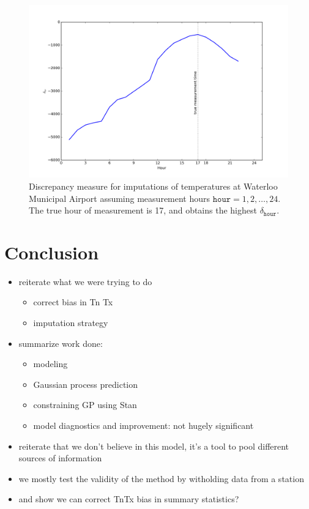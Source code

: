 \documentclass[letter]{article}
\makeatletter
\def\maxwidth{\ifdim\Gin@nat@width>\linewidth\linewidth
\else\Gin@nat@width\fi}
\let\Oldincludegraphics\includegraphics
\renewcommand{\includegraphics}[1]{\Oldincludegraphics[width=.8\maxwidth]{#1}}
\providecommand{\tightlist}{%
      \setlength{\itemsep}{0pt}\setlength{\parskip}{0pt}}
\newcommand{\hour}{\mathtt{hour}}
\providecommand{\tightlist}{%
  	  \setlength{\itemsep}{0pt}\setlength{\parskip}{0pt}}
\makeatother
\begin{document}
        \begin{figure}
\centering
\includegraphics{../figures/hr_inference.png}
\caption{\label{fig:hr_inference} Discrepancy measure for imputations of temperatures at Waterloo Municipal Airport assuming measurement hours \(\hour=1,2,\ldots,24\). The true hour of measurement is 17, and obtains the highest \(\delta_\hour\).}
\end{figure}
    


        \section{Conclusion}\label{conclusion}

\begin{itemize}
\tightlist
\item
  reiterate what we were trying to do

  \begin{itemize}
  \tightlist
  \item
    correct bias in Tn Tx
  \item
    imputation strategy
  \end{itemize}
\item
  summarize work done:

  \begin{itemize}
  \tightlist
  \item
    modeling
  \item
    Gaussian process prediction
  \item
    constraining GP using Stan
  \item
    model diagnostics and improvement: not hugely significant
  \end{itemize}
\item
  reiterate that we don't believe in this model, it's a tool to pool different sources of information
\item
  we mostly test the validity of the method by witholding data from a station
\item
  and show we can correct TnTx bias in summary statistics?
\end{itemize}
    
\end{document}
